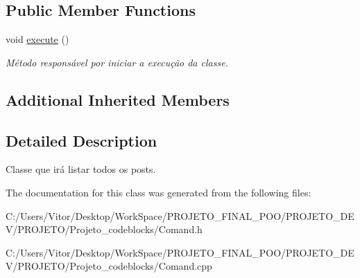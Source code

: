 \subsection*{Public Member Functions}
\begin{DoxyCompactItemize}
\item 
\hypertarget{class_command_find_all_post_a701c5ce055da556f02e95e33ef2a7334}{void \hyperlink{class_command_find_all_post_a701c5ce055da556f02e95e33ef2a7334}{execute} ()}\label{class_command_find_all_post_a701c5ce055da556f02e95e33ef2a7334}

\begin{DoxyCompactList}\small\item\em Método responsável por iniciar a execução da classe. \end{DoxyCompactList}\end{DoxyCompactItemize}
\subsection*{Additional Inherited Members}


\subsection{Detailed Description}
Classe que irá listar todos os posts. 

The documentation for this class was generated from the following files\-:\begin{DoxyCompactItemize}
\item 
C\-:/\-Users/\-Vitor/\-Desktop/\-Work\-Space/\-P\-R\-O\-J\-E\-T\-O\-\_\-\-F\-I\-N\-A\-L\-\_\-\-P\-O\-O/\-P\-R\-O\-J\-E\-T\-O\-\_\-\-D\-E\-V/\-P\-R\-O\-J\-E\-T\-O/\-Projeto\-\_\-codeblocks/Comand.\-h\item 
C\-:/\-Users/\-Vitor/\-Desktop/\-Work\-Space/\-P\-R\-O\-J\-E\-T\-O\-\_\-\-F\-I\-N\-A\-L\-\_\-\-P\-O\-O/\-P\-R\-O\-J\-E\-T\-O\-\_\-\-D\-E\-V/\-P\-R\-O\-J\-E\-T\-O/\-Projeto\-\_\-codeblocks/Comand.\-cpp\end{DoxyCompactItemize}
